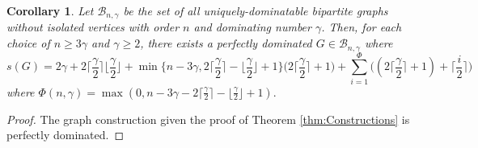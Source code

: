 \documentclass[12pt]{amsart}
\newtheorem{cor}[thm]{Corollary}
\begin{document}
\begin{cor}\label{cor:PerfectDomConstruction}
     Let $\mathcal{B}_{n,\gamma}$ be the set of all uniquely-dominatable bipartite graphs without isolated vertices with order $n$ and dominating number $\gamma$. Then, for each choice of $n\geq 3\gamma$ and $\gamma \geq 2$, there exists a perfectly dominated $G \in \mathcal{B}_{n,\gamma}$ where $$s(G) = 2 \gamma + 2 \Big\lceil \frac{\gamma}{2} \Big\rceil \Big\lfloor \frac{\gamma}{2} \Big\rfloor + \min\Big\{n-3\gamma, 2 \Big\lceil \frac{\gamma}{2} \Big\rceil - \Big\lfloor \frac{\gamma}{2}\Big\rfloor+ 1\Big\}\Big(2\Big\lceil\frac{\gamma}{2}\Big\rceil + 1\Big) + \sum_{i=1}^\Phi \Big((2\Big\lceil\frac{\gamma}{2}\Big\rceil+1) + \Big\lceil\frac{i}{2}\Big\rceil\Big)$$
where $\Phi(n,\gamma) = \max(0, n-3\gamma - 2\lceil\frac{\gamma}{2}\rceil - \lfloor\frac{\gamma}{2}\rfloor + 1).$
\end{cor}
\begin{proof}
    The graph construction given the proof of Theorem \ref{thm:Constructions} is perfectly dominated.
\end{proof}
\end{document}
